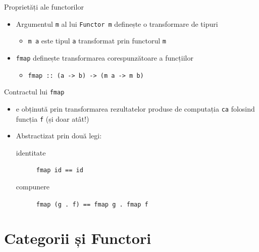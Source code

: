 \documentclass[xcolor=pdftex,romanian,colorlinks]{beamer}
\begin{document}
\begin{frame}{Proprietăți ale functorilor}
\begin{itemize}
\item Argumentul \lstinline$m$ al lui \lstinline$Functor m$ definește o transformare de tipuri 
\begin{itemize}
\item \lstinline$m a$ este tipul \lstinline$a$ transformat prin functorul \lstinline$m$
\end{itemize}
\item \lstinline$fmap$ definește transformarea corespunzătoare a funcțiilor
\begin{itemize}
\item \lstinline$fmap :: (a -> b) -> $\alert{\lstinline$($}\lstinline$m a -> m b$\alert{\lstinline$)$}
\end{itemize}
\end{itemize}
\begin{block}{Contractul lui \lstinline$fmap$}
\begin{itemize}
\item {} e obținută prin transformarea rezultatelor produse de computația \lstinline$ca$ folosind funcția \lstinline$f$ (și doar atât!)
\item Abstractizat prin două legi:
\begin{description}
\item[identitate] \lstinline$fmap id == id$
\item[compunere] \lstinline$fmap (g . f) == fmap g . fmap f$
\end{description}
\end{itemize}
\end{block}

\end{frame}

\section{Categorii și Functori}
\end{document}
